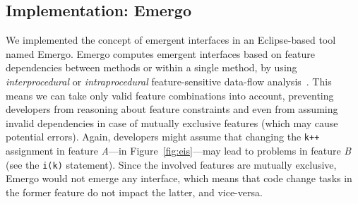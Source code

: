 




\subsection{Implementation: Emergo}

We implemented the concept of emergent interfaces in an Eclipse-based tool named Emergo. Emergo computes emergent interfaces based on feature dependencies between methods or within a single method, by using \textit{interprocedural} or \textit{intraprocedural} feature-sensitive data-flow analysis~\cite{brabrand-dfa4spl-aosd12, bodden-ifds4spl-pldi13}. This means we can take only valid feature combinations into account, preventing developers from reasoning about feature constraints and even from assuming invalid dependencies in case of mutually exclusive features (which may cause potential errors). Again, developers might assume that changing the \texttt{k++} assignment in feature \textit{A}---in Figure~\ref{fig:eis}---may lead to problems in feature \textit{B} (see the \texttt{i(k)} statement). Since the involved features are mutually exclusive, Emergo would not emerge any interface, which means that code change tasks in the former feature do not impact the latter, and vice-versa.

